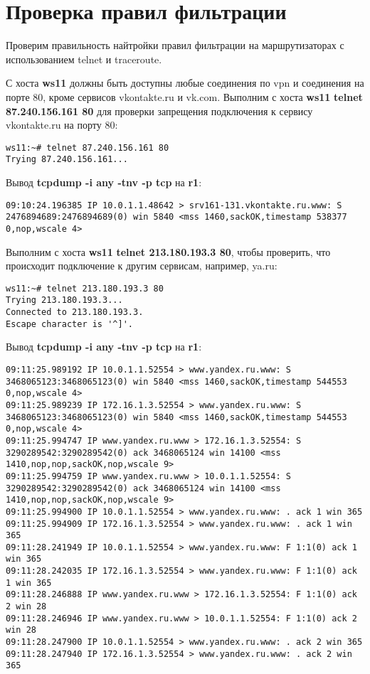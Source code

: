 \documentclass[a4paper,12pt]{article}
\begin{document}
\section{Проверка правил фильтрации}

Проверим правильность найтройки правил фильтрации на маршрутизаторах
с использованием  telnet и traceroute.

С хоста \textbf{ws11} должны быть доступны любые соединения по vpn и соединения на
порте 80, кроме сервисов vkontakte.ru и vk.com.
Выполним с хоста \textbf{ws11} \textbf{telnet 87.240.156.161 80} для проверки запрещения подключения
к сервису vkontakte.ru на порту 80:
\begin{Verbatim}
ws11:~# telnet 87.240.156.161 80
Trying 87.240.156.161...
\end{Verbatim}

Вывод \textbf{tcpdump -i any -tnv -p tcp} на \textbf{r1}:
\begin{Verbatim}
09:10:24.196385 IP 10.0.1.1.48642 > srv161-131.vkontakte.ru.www: S 2476894689:2476894689(0) win 5840 <mss 1460,sackOK,timestamp 538377 0,nop,wscale 4>
\end{Verbatim}

Выполним с хоста \textbf{ws11} \textbf{telnet 213.180.193.3 80},  чтобы проверить, что
происходит подключение к другим сервисам, например, ya.ru:
\begin{Verbatim}
ws11:~# telnet 213.180.193.3 80
Trying 213.180.193.3...
Connected to 213.180.193.3.
Escape character is '^]'.
\end{Verbatim}

Вывод \textbf{tcpdump -i any -tnv -p tcp} на \textbf{r1}:
\begin{Verbatim}
09:11:25.989192 IP 10.0.1.1.52554 > www.yandex.ru.www: S 3468065123:3468065123(0) win 5840 <mss 1460,sackOK,timestamp 544553 0,nop,wscale 4>
09:11:25.989239 IP 172.16.1.3.52554 > www.yandex.ru.www: S 3468065123:3468065123(0) win 5840 <mss 1460,sackOK,timestamp 544553 0,nop,wscale 4>
09:11:25.994747 IP www.yandex.ru.www > 172.16.1.3.52554: S 3290289542:3290289542(0) ack 3468065124 win 14100 <mss 1410,nop,nop,sackOK,nop,wscale 9>
09:11:25.994759 IP www.yandex.ru.www > 10.0.1.1.52554: S 3290289542:3290289542(0) ack 3468065124 win 14100 <mss 1410,nop,nop,sackOK,nop,wscale 9>
09:11:25.994900 IP 10.0.1.1.52554 > www.yandex.ru.www: . ack 1 win 365
09:11:25.994909 IP 172.16.1.3.52554 > www.yandex.ru.www: . ack 1 win 365
09:11:28.241949 IP 10.0.1.1.52554 > www.yandex.ru.www: F 1:1(0) ack 1 win 365
09:11:28.242035 IP 172.16.1.3.52554 > www.yandex.ru.www: F 1:1(0) ack 1 win 365
09:11:28.246888 IP www.yandex.ru.www > 172.16.1.3.52554: F 1:1(0) ack 2 win 28
09:11:28.246946 IP www.yandex.ru.www > 10.0.1.1.52554: F 1:1(0) ack 2 win 28
09:11:28.247900 IP 10.0.1.1.52554 > www.yandex.ru.www: . ack 2 win 365
09:11:28.247940 IP 172.16.1.3.52554 > www.yandex.ru.www: . ack 2 win 365
\end{Verbatim}
\end{document}
